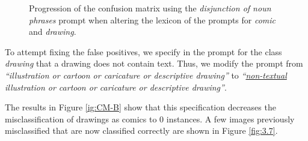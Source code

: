 \begin{figure}[ht]
    \centering
    \hfill
    \hfill
    \caption{Progression of the confusion matrix using the \textit{disjunction of noun phrases} prompt when altering the lexicon of the prompts for \textit{comic} and \textit{drawing}.}
    \label{fig:CMs altering lexicon}
\end{figure}


To attempt fixing the false positives, we specify in the prompt for the class \textit{drawing} that a drawing does not contain text. Thus, we modify the prompt from \textit{“illustration or cartoon or caricature or descriptive drawing”} to \textit{“\underline{non-textual} illustration or cartoon or caricature or descriptive drawing”}. 

The results in Figure \ref{ig:CM-B} show that this specification decreases the misclassification of drawings as comics to 0 instances. A few images previously misclassified that are now classified correctly are shown in Figure \ref{fig:3.7}.

